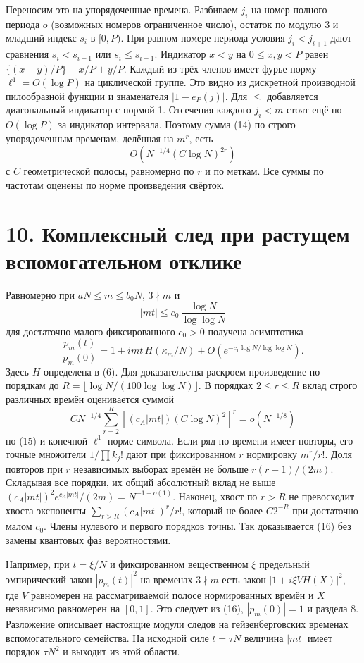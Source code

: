 \documentclass[11pt,a4paper]{article}
\newcommand{\sect}[1]{\section*{\sffamily\color{ink}#1}}
\begin{document}
Переносим это на упорядоченные времена. Разбиваем $j_i$ на номер полного периода $o$ (возможных номеров ограниченное число), остаток по модулю 3 и младший индекс $s_i$ в $[0,P)$. При равном номере периода условия $j_i<j_{i+1}$ дают сравнения $s_i<s_{i+1}$ или $s_i\le s_{i+1}$. Индикатор $x<y$ на $0\le x,y<P$ равен $\{(x-y)/P\}-x/P+y/P$. Каждый из трёх членов имеет фурье-норму $\ell^1=O(\log P)$ на циклической группе. Это видно из дискретной производной пилообразной функции и знаменателя $|1-e_P(j)|$. Для $\le$ добавляется диагональный индикатор с нормой 1. Отсечения каждого $j_i<m$ стоят ещё по $O(\log P)$ за индикатор интервала. Поэтому сумма (14) по строго упорядоченным временам, делённая на $m^r$, есть
\[
                        O\!\left(N^{-1/4}(C\log N)^{2r}\right)     \tag{15}
\]
с $C$ геометрической полосы, равномерно по $r$ и по меткам. Все суммы по частотам оценены по норме произведения свёрток.
\newpage
\sect{10. Комплексный след при растущем вспомогательном отклике}
Равномерно при $aN\le m\le b_0 N$, $3\nmid m$ и
\[
                     |mt|\le c_0\,\frac{\log N}{\log\log N}
\]
для достаточно малого фиксированного $c_0>0$ получена асимптотика
\[
 \boxed{\displaystyle
       \frac{p_m(t)}{p_m(0)}
             =1+i mt\,H(\kappa_m/N)
                    +O\!\left(e^{-c_1\log N/\log\log N}\right).}     \tag{16}
\]
Здесь $H$ определена в (6). Для доказательства раскроем произведение по порядкам до $R=\lfloor\log N/(100\log\log N)\rfloor$. В порядках $2\le r\le R$ вклад строго различных времён оценивается суммой
\[
           C N^{-1/4}\sum_{r=2}^R
                    [(c_A |mt|)(C\log N)^2]^r=o(N^{-1/8})
\]
по (15) и конечной $\ell^1$-норме символа. Если ряд по времени имеет повторы, его точные множители $1/\prod k_j!$ дают при фиксированном $r$ нормировку $m^r/r!$. Доля повторов при $r$ независимых выборах времён не больше $r(r-1)/(2m)$. Складывая все порядки, их общий абсолютный вклад не выше $(c_A |mt|)^2 e^{c_A|mt|}/(2m)=N^{-1+o(1)}$. Наконец, хвост по $r>R$ не превосходит хвоста экспоненты $\sum_{r>R}(c_A|mt|)^r/r!$, который не более $C2^{-R}$ при достаточно малом $c_0$. Члены нулевого и первого порядков точны. Так доказывается (16) без замены квантовых фаз вероятностями.

Например, при $t=\xi/N$ и фиксированном вещественном $\xi$ предельный эмпирический закон $|p_m(t)|^2$ на временах $3\nmid m$ есть закон $|1+i\xi V H(X)|^2$, где $V$ равномерен на рассматриваемой полосе нормированных времён и $X$ независимо равномерен на $[0,1]$. Это следует из (16), $|p_m(0)|=1$ и раздела 8. Разложение описывает настоящие модули следов на гейзенберговских временах вспомогательного семейства. На исходной силе $t=\tau N$ величина $|mt|$ имеет порядок $\tau N^2$ и выходит из этой области.
\end{document}
